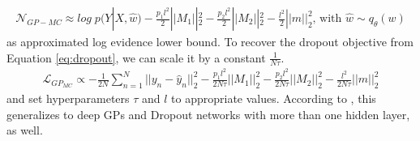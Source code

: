 \documentclass[a4paper,cleardoubleempty,BCOR1cm, 11pt]{report}
\begin{document}
\begin{align*}
\mathcal{N}_{GP-MC} \approx log\;p(Y|X, \hat{w}) - \frac{p_1 l^2}{2} ||M_1||^2_2 - \frac{p_2 l^2}{2}||M_2||^2_2 - \frac{l^2}{2}||m||^2_2 \text{, with } \hat{w} \sim q_{\theta}(w)
\end{align*}
as approximated log evidence lower bound.
To recover the dropout objective from Equation \ref{eq:dropout}, we can scale it by a constant $\frac{1}{N \tau}$.
\begin{align*}
\mathcal{L}_{GP_{MC}} \propto  - \frac{1}{2N} \sum_{n=1}^N ||y_n - \hat{y}_n||^2_2 -  \frac{p_1 l^2}{2N\tau} ||M_1||^2_2 - \frac{p_2 l^2}{2N\tau}||M_2||^2_2 - \frac{l^2}{2N\tau}||m||^2_2
\end{align*}
and set hyperparameters $\tau$ and $l$ to appropriate values. According to \citet{gal2016dropout}, this generalizes to deep GPs and Dropout networks with more than one hidden layer, as well.
\end{document}
